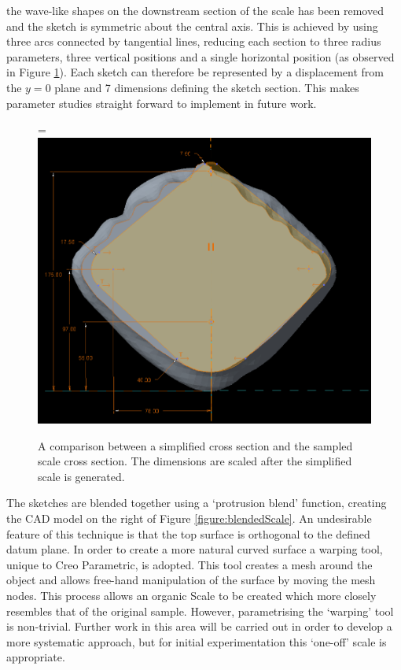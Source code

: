 \documentclass[12pt,oneside,a4paper]{article}
\newcommand*{\vcenteredhbox}[1]{\begingroup
\setbox0=\hbox{#1}\parbox{\wd0}{\box0}\endgroup}
\begin{document}
the wave-like shapes on the downstream section of the scale has been removed and the sketch is symmetric about the central axis. This is achieved by using three arcs connected by tangential lines, reducing each section to three radius parameters, three vertical positions and a single horizontal position (as observed in Figure \ref{figure:crossSection}). Each sketch can therefore be represented by a displacement from the $y=0$ plane and 7 dimensions defining the sketch section. This makes parameter studies straight forward to implement in future work. 

\begin{figure}[!b]
\centering
\vcenteredhbox{\includegraphics[width=12cm]{images/cross_section_sketch.PNG}}
\caption{A comparison between a simplified cross section and the sampled scale cross section. The dimensions are scaled after the simplified scale is generated.}
\label{figure:crossSection}
\end{figure}

The sketches are blended together using a `protrusion blend' function, creating the CAD model on the right of Figure \ref{figure:blendedScale}. An undesirable feature of this technique is that the top surface is orthogonal to the defined datum plane. In order to create a more natural curved surface a warping tool, unique to Creo Parametric, is adopted. This tool creates a mesh around the object and allows free-hand manipulation of the surface by moving the mesh nodes. This process allows an organic Scale to be created which more closely resembles that of the original sample. However, parametrising the `warping' tool is non-trivial. Further work in this area will be carried out in order to develop a more systematic approach, but for initial experimentation this `one-off' scale is appropriate.
\end{document}
